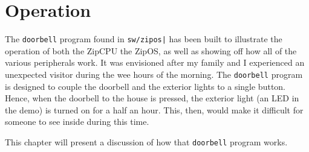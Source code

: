 \documentclass{gqtekspec}
\begin{document}
\chapter{Operation}
The {\tt doorbell} program found in {\tt sw/zipos|} has been built to
illustrate the operation of both the ZipCPU the ZipOS, as well as showing off
how all of the various peripherals work.  It was envisioned after my family
and I experienced an unexpected visitor during the wee hours of the morning.
The {\tt doorbell} program is designed to couple the doorbell and the exterior
lights to a single button.  Hence, when the doorbell to the house is pressed,
the exterior light (an LED in the demo) is turned on for a half an hour.  This,
then, would make it difficult for someone to see inside during this time.

This chapter will present a discussion of how that {\tt doorbell} program works.
\end{document}
